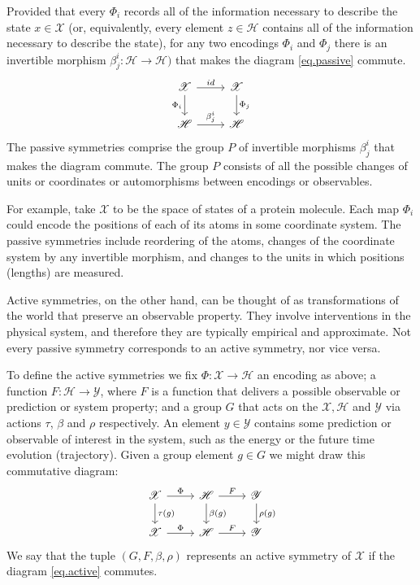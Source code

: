 \documentclass{article} %
\renewcommand{\mathcal}[1]{\mathscr{#1}} %
\begin{document}
Provided that every $\Phi_i$ records all of the information necessary to describe the state $x\in \mathcal{X}$ (or, equivalently, every element $z\in \mathcal{H}$ contains all of the information necessary to describe the state),
for any two encodings $\Phi_i$ and $\Phi_j$ there is an invertible morphism $\beta_j^i:\mathcal{H}\to\mathcal{H})$ that makes the diagram \eqref{eq.passive} commute.
\begin{equation}\label{eq.passive}
\begin{tikzcd}[every label/.append ]
  {\mathcal{X}}\arrow[r, "id"] \arrow[d,"\Phi_i",swap] & {\mathcal{X}}  \arrow[d,"\Phi_j"]\\
{\mathcal{H}} \arrow[r, "\beta_j^i"]  & {\mathcal{H}} 
\end{tikzcd}
\end{equation}
The passive symmetries comprise the group $P$ of invertible morphisms $\beta_j^i$ that makes the diagram commute.
The group $P$ consists of all the possible changes of units or coordinates or automorphisms between encodings or observables. 

For example, take $\mathcal{X}$ to be the space of states of a protein molecule.
Each map $\Phi_i$ could encode the positions of each of its atoms in some coordinate system.
The passive symmetries include reordering of the atoms, changes of the coordinate system by any invertible morphism, and changes to the units in which positions (lengths) are measured.

Active symmetries, on the other hand, can be thought of as transformations of the world that preserve an observable property.
They involve interventions in the physical system, and therefore they are typically empirical and approximate.
Not every passive symmetry corresponds to an active symmetry, nor vice versa.

To define the active symmetries we fix $\Phi:\mathcal X \to \mathcal{H}$ an encoding as above; a function $F: \mathcal H \to \mathcal Y$, where $F$ is a function that delivers a possible observable or prediction or system property; and a group $G$ that acts on the $\mathcal X, \mathcal H$ and $\mathcal Y$ via actions $\tau$, $\beta$ and $\rho$ respectively.
An element $y\in\mathcal{Y}$ contains some prediction or observable of interest in the system, such as the energy or the future time evolution (trajectory).
Given a group element $g\in G$ we might draw this commutative diagram:
\begin{equation}\label{eq.active}
\begin{tikzcd}[every label/.append]
  {\mathcal X}\arrow[r,"\Phi"] \arrow[d,"\tau(g)"] 
  & 
  {\mathcal H}  \arrow[d,"\beta(g)"] \arrow[r,"F"]
  & 
  {\mathcal Y}  \arrow[d,"\rho(g)"]
  \\
{\mathcal X} \arrow[r,"\Phi"]  
& 
{\mathcal H} \arrow[r,"F"]
&
{\mathcal Y} 
\end{tikzcd}
\end{equation}
We say that the tuple $(G, F, \beta, \rho)$ represents an active symmetry of $\mathcal X$ if the diagram \eqref{eq.active} commutes.
\end{document}
